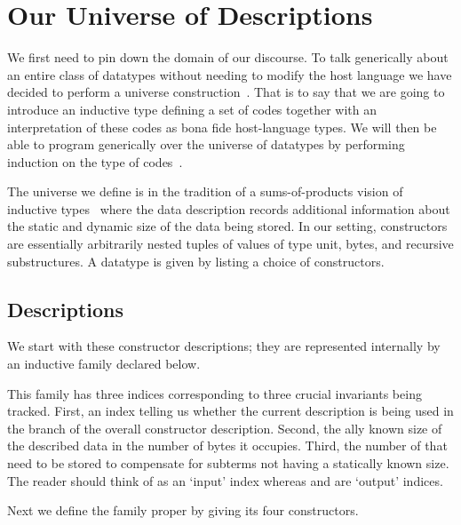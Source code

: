 \section{Our Universe of Descriptions}\label{sec:desc}

We first need to pin down the domain of our discourse.
%
To talk generically about an entire class of datatypes
without needing to modify the host language
we have decided to perform a universe
construction~\cite{benke-ugpp, DBLP:phd/ethos/Morris07, DBLP:conf/icfp/LohM11}.
%
That is to say that we are going to introduce an inductive type
defining a set of codes together
with an interpretation of these codes as bona fide
host-language types.
%
We will then be able to program generically over the universe of
datatypes by performing induction on the type of
codes~\cite{DBLP:conf/tphol/PfeiferR99}.

The universe we define is in the tradition of
a sums-of-products vision of inductive types~\cite{DBLP:conf/popl/JanssonJ97}
where the data description records additional information about
the static and dynamic size of the data being stored.
%
In our setting, constructors are essentially arbitrarily nested tuples of
values of type unit,
bytes,
and recursive substructures.
%
A datatype is given by listing a choice of constructors.

\subsection{Descriptions}

We start with these constructor descriptions;
they are represented internally by an inductive family 
declared below.


This family has three indices corresponding to three crucial
invariants being tracked.
%
First, an index telling us whether the current description
is being used in the  branch of the overall
constructor description.
%
Second, the ally known size of the described data
in the number of bytes it occupies.
%
Third, the number of  that need to be stored to
compensate for subterms not having a statically known size.
%
The reader should think of  as an `input' index
whereas  and  are `output' indices.

Next we define the family proper by giving its four constructors.

